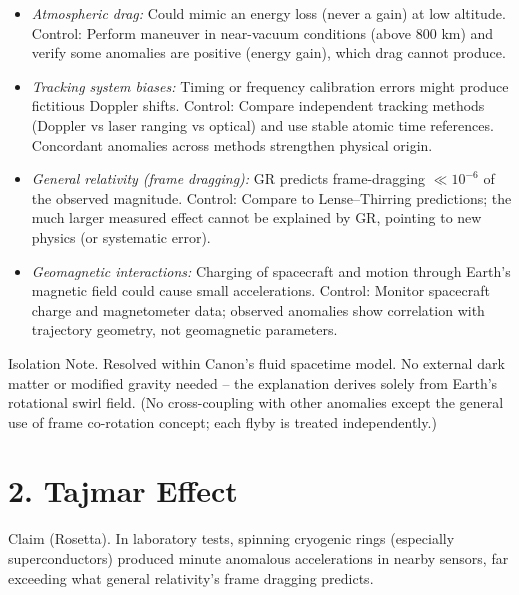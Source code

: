 \documentclass[11pt]{article}
\begin{document}
\begin{itemize}

\item 
\textit{Atmospheric drag:} Could mimic an energy loss (never a gain) at low altitude. Control: Perform maneuver in near-vacuum conditions (above 800 km) and verify some anomalies are positive (energy gain), which drag cannot produce.




\item 
\textit{Tracking system biases:} Timing or frequency calibration errors might produce fictitious Doppler shifts. Control: Compare independent tracking methods (Doppler vs laser ranging vs optical) and use stable atomic time references. Concordant anomalies across methods strengthen physical origin.




\item 
\textit{General relativity (frame dragging):} GR predicts frame-dragging $\ll 10^{-6}$ of the observed magnitude. Control: Compare to Lense–Thirring predictions; the much larger measured effect cannot be explained by GR, pointing to new physics (or systematic error).




\item 
\textit{Geomagnetic interactions:} Charging of spacecraft and motion through Earth’s magnetic field could cause small accelerations. Control: Monitor spacecraft charge and magnetometer data; observed anomalies show correlation with trajectory geometry, not geomagnetic parameters.




\end{itemize}

Isolation Note. Resolved within Canon’s fluid spacetime model. No external dark matter or modified gravity needed – the explanation derives solely from Earth’s rotational swirl field. (No cross-coupling with other anomalies except the general use of frame co-rotation concept; each flyby is treated independently.)


\section*{2. Tajmar Effect}

Claim (Rosetta). In laboratory tests, spinning cryogenic rings (especially superconductors) produced minute anomalous accelerations in nearby sensors, far exceeding what general relativity’s frame dragging predicts.
\end{document}
